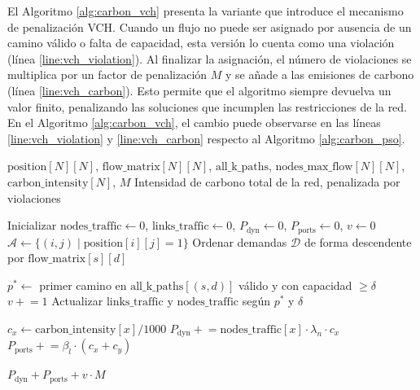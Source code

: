 El Algoritmo \ref{alg:carbon_vch} presenta la variante que introduce el mecanismo de penalización VCH. Cuando un flujo no puede ser asignado por ausencia de un camino válido o falta de capacidad, esta versión lo cuenta como una violación (línea \ref{line:vch_violation}). Al finalizar la asignación, el número de violaciones se multiplica por un factor de penalización $M$ y se añade a las emisiones de carbono (línea \ref{line:vch_carbon}). Esto permite que el algoritmo siempre devuelva un valor finito, penalizando las soluciones que incumplen las restricciones de la red. En el Algoritmo \ref{alg:carbon_vch}, el cambio puede observarse en las líneas \ref{line:vch_violation} y \ref{line:vch_carbon} respecto al Algoritmo \ref{alg:carbon_pso}.

\begin{algorithm}[H]
\caption{Cálculo de la emisiones totales de la red para PSO VCH}
\label{alg:carbon_vch}
\begin{algorithmic}[1]
\Require $\text{position}[N][N]$, $\text{flow\_matrix}[N][N]$, $\text{all\_k\_paths}$, $\text{nodes\_max\_flow}[N][N]$, $\text{carbon\_intensity}[N]$, $M$
\Ensure Intensidad de carbono total de la red, penalizada por violaciones

\State Inicializar $\text{nodes\_traffic} \leftarrow 0$, $\text{links\_traffic} \leftarrow 0$, $P_{\text{dyn}} \leftarrow 0$, $P_{\text{ports}} \leftarrow 0$, $v \leftarrow 0$
\State $\mathcal{A} \leftarrow \{(i,j) \mid \text{position}[i][j] = 1\}$
\State Ordenar demandas $\mathcal{D}$ de forma descendente por $\text{flow\_matrix}[s][d]$

    \State $p^* \leftarrow$ primer camino en $\text{all\_k\_paths}[(s,d)]$ válido y con capacidad $\geq \delta$
        \State $v \mathrel{+}= 1$  \label{line:vch_violation}
    \Else
        \State Actualizar $\text{links\_traffic}$ y $\text{nodes\_traffic}$ según $p^*$ y $\delta$
    \EndIf
\EndFor

    \State $c_x \leftarrow \text{carbon\_intensity}[x] / 1000$
    \State $P_{\text{dyn}} \mathrel{+}= \text{nodes\_traffic}[x] \cdot \lambda_n \cdot c_x$
        \State $P_{\text{ports}} \mathrel{+}= \beta_l \cdot (c_x + c_y)$
    \EndFor
\EndFor

\State \Return $P_{\text{dyn}} + P_{\text{ports}} + v \cdot M$ \label{line:vch_carbon}
\end{algorithmic}
\end{algorithm}